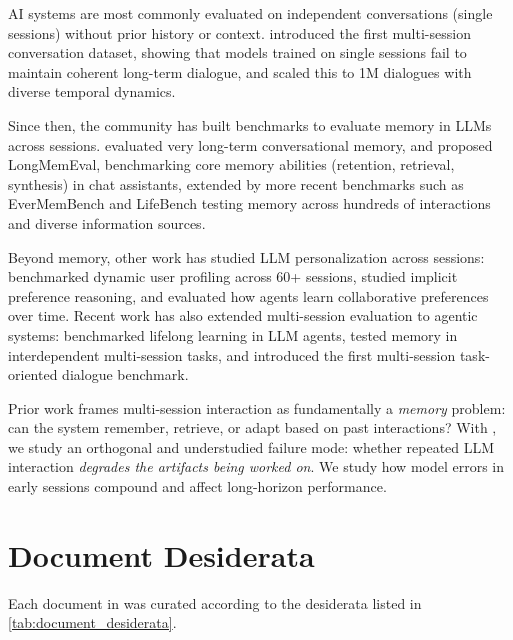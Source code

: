 \documentclass{article} %
\begin{document}
AI systems are most commonly evaluated on independent conversations (single sessions) without prior history or context. \citet{Xu2021BeyondGM} introduced the first multi-session conversation dataset, showing that models trained on single sessions fail to maintain coherent long-term dialogue, and \citet{Jang2023ConversationCT} scaled this to 1M dialogues with diverse temporal dynamics.

Since then, the community has built benchmarks to evaluate memory in LLMs across sessions. \citet{Maharana2024EvaluatingVL} evaluated very long-term conversational memory, and \citet{Wu2024LongMemEvalBC} proposed LongMemEval, benchmarking core memory abilities (retention, retrieval, synthesis) in chat assistants, extended by more recent benchmarks such as EverMemBench \cite{Hu2026EverMemBenchBL} and LifeBench \cite{Cheng2026LifeBenchAB} testing memory across hundreds of interactions and diverse information sources.

Beyond memory, other work has studied LLM personalization across sessions: \citet{Jiang2025KnowMR} benchmarked dynamic user profiling across 60+ sessions, \citet{Li2025TowardMP} studied implicit preference reasoning, and \citet{Mehri2026MultiSessionCollabLU} evaluated how agents learn collaborative preferences over time. Recent work has also extended multi-session evaluation to agentic systems: \citet{Zheng2025LifelongAgentBenchEL} benchmarked lifelong learning in LLM agents, \citet{He2026MemoryArenaBA} tested memory in interdependent multi-session tasks, and \citet{Du2025MemGuideIM} introduced the first multi-session task-oriented dialogue benchmark.

Prior work frames multi-session interaction as fundamentally a \textit{memory} problem: can the system remember, retrieve, or adapt based on past interactions? With \benchmark{}, we study an orthogonal and understudied failure mode: whether repeated LLM interaction \textit{degrades the artifacts being worked on}. We study how model errors in early sessions compound and affect long-horizon performance.

\section{Document Desiderata} \label{app:document_desiderata}

Each document in \benchmark{} was curated according to the desiderata listed in \autoref{tab:document_desiderata}.

\begin{table}[h!]

\caption{Desiderata guiding the curation of documents in \benchmark{}.}
\label{tab:document_desiderata}
\end{table}
\end{document}
